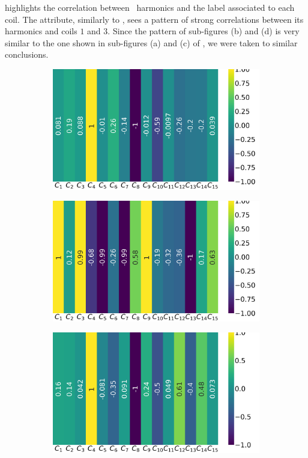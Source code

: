  highlights the correlation between \bn\ harmonics and the label associated
to each coil. The attribute, similarly to \an, sees a pattern of strong correlations between its
harmonics and coils $1$ and $3$. Since the pattern of sub-figures (b) and (d) is very similar to the
one shown in sub-figures (a) and (c) of , we were taken to similar
conclusions.
\begin{figure}[!ht]
	\centering
	\begin{subfigure}{0.49\linewidth}
		\includegraphics[width=\linewidth]{img/qlp_corr/Bn_coil0.png}
	\end{subfigure}
	\begin{subfigure}{0.49\linewidth}
		\includegraphics[width=\linewidth]{img/qlp_corr/Bn_coil1.png}
	\end{subfigure}
	\begin{subfigure}{0.49\linewidth}
		\includegraphics[width=\linewidth]{img/qlp_corr/Bn_coil2.png}

\end{subfigure}
\end{figure}
